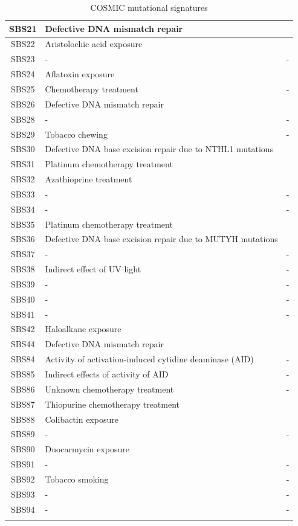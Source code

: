 \begin{longtable}{c|p{10cm}|c}
SBS21 & Defective DNA mismatch repair & \cite{Meier2018-cj} \\ \hline
SBS22 & Aristolochic acid exposure & \cite{Nik-Zainal2015-bj} \\ \hline
SBS23 & - & - \\ \hline
SBS24 & Aflatoxin exposure &  \cite{Chawanthayatham2017-oh} \\ \hline
SBS25 & Chemotherapy treatment & - \\ \hline
SBS26 & Defective DNA mismatch repair &  \cite{Meier2018-cj} \\ \hline
SBS28 & - & - \\ \hline
SBS29 & Tobacco chewing & - \\ \hline
SBS30 & Defective DNA base excision repair due to NTHL1 mutations &  \cite{Drost2017-xw} \\ \hline
SBS31 & Platinum chemotherapy treatment & \cite{Boot2018-gv} \\ \hline
SBS32 & Azathioprine treatment & \cite{Inman2018-fh} \\ \hline
SBS33 & - & - \\ \hline
SBS34 & - & - \\ \hline
SBS35 & Platinum chemotherapy treatment & \cite{Boot2018-gv} \\ \hline
SBS36 & Defective DNA base excision repair due to MUTYH mutations & \cite{Pilati2017-mx} \\ \hline
SBS37 & - &  - \\ \hline
SBS38 & Indirect effect of UV light & - \\ \hline
SBS39 & - & - \\ \hline
SBS40 & - & - \\ \hline
SBS41 & - & - \\ \hline
SBS42 & Haloalkane exposure &  \cite{Mimaki2016-kh} \\ \hline
SBS44 & Defective DNA mismatch repair & \cite{Drost2017-xw} \\ \hline
SBS84 & Activity of activation-induced cytidine deaminase (AID) & - \\ \hline
SBS85 & Indirect effects of activity of AID & - \\ \hline
SBS86 & Unknown chemotherapy treatment & - \\ \hline
SBS87 & Thiopurine chemotherapy treatment & \cite{Li2020-re} \\ \hline
SBS88 & Colibactin exposure &  \cite{Pleguezuelos-Manzano2020-er} \\ \hline
SBS89 & - & - \\ \hline
SBS90 & Duocarmycin exposure &  \cite{Boot2020-gg} \\ \hline
SBS91 & - & -\\ \hline
SBS92 & Tobacco smoking & - \\ \hline
SBS93 & - & - \\ \hline
SBS94 & - & - \\ \hline
\caption{COSMIC mutational signatures}
\end{longtable}
